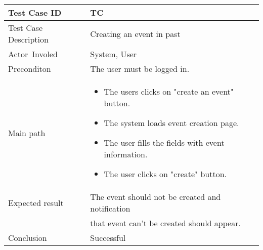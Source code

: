 \begin{center} \begin{tabular}{|l|l|}
  \hline
  Test Case ID & TC \z\\
  \hline
  Test Case Description & Creating an event in past\\
  \hline
  Actor Involed & System, User\\
   \hline
  Preconditon & The user must be logged in.\\
  \hline
  Main path &   \begin{minipage}{5in}
    \vskip 4pt
            \begin{itemize}
              \item The users clicks on "create an event" button.
              \item The system loads event creation page.
              \item The user fills the fields with event information.
              \item The user clicks on "create" button.
            \end{itemize}
    \vskip 4pt
  \end{minipage}  \\
  \hline
  Expected result & The event should not be created and notification\\
  & that event can't be created should appear.\\
  \hline
  Conclusion & Successful\\
  \hline
\end{tabular} \end{center}
